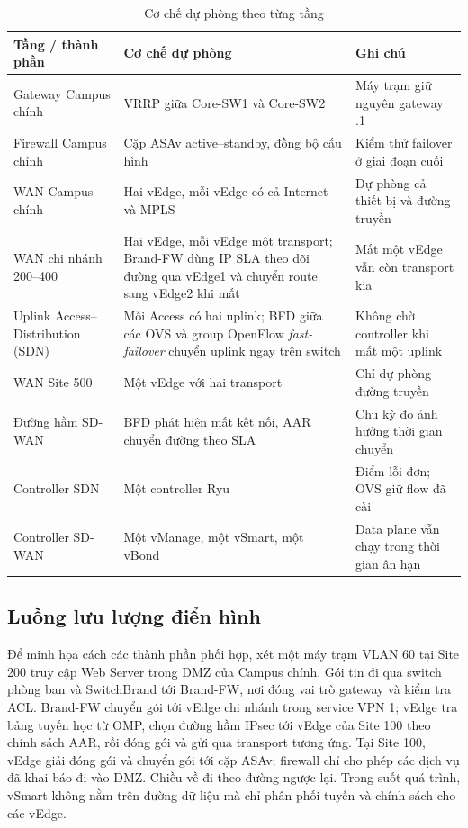 \begin{table}[H]
    \centering
    \small
    \caption{Cơ chế dự phòng theo từng tầng}
    \label{tab:du_phong}
    \begin{tabularx}{\textwidth}{|P{3.0cm}|X|P{3.6cm}|}
        \hline
        \textbf{Tầng / thành phần} & \textbf{Cơ chế dự phòng} & \textbf{Ghi chú} \\
        \hline
        Gateway Campus chính & VRRP giữa Core-SW1 và Core-SW2 & Máy trạm giữ nguyên gateway .1 \\
        \hline
        Firewall Campus chính & Cặp ASAv active--standby, đồng bộ cấu hình & Kiểm thử failover ở giai đoạn cuối \\
        \hline
        WAN Campus chính & Hai vEdge, mỗi vEdge có cả Internet và MPLS & Dự phòng cả thiết bị và đường truyền \\
        \hline
        WAN chi nhánh 200--400 & Hai vEdge, mỗi vEdge một transport; Brand-FW dùng IP SLA theo dõi đường qua vEdge1 và chuyển route sang vEdge2 khi mất & Mất một vEdge vẫn còn transport kia \\
        \hline
        Uplink Access--Distribution (SDN) & Mỗi Access có hai uplink; BFD giữa các OVS và group OpenFlow \textit{fast-failover} chuyển uplink ngay trên switch & Không chờ controller khi mất một uplink \\
        \hline
        WAN Site 500 & Một vEdge với hai transport & Chỉ dự phòng đường truyền \\
        \hline
        Đường hầm SD-WAN & BFD phát hiện mất kết nối, AAR chuyển đường theo SLA & Chu kỳ đo ảnh hưởng thời gian chuyển \\
        \hline
        Controller SDN & Một controller Ryu & Điểm lỗi đơn; OVS giữ flow đã cài \\
        \hline
        Controller SD-WAN & Một vManage, một vSmart, một vBond & Data plane vẫn chạy trong thời gian ân hạn \\
        \hline
    \end{tabularx}
\end{table}

\subsection{Luồng lưu lượng điển hình}

Để minh họa cách các thành phần phối hợp, xét một máy trạm VLAN 60 tại Site 200 truy cập Web Server trong DMZ của Campus chính. Gói tin đi qua switch phòng ban và SwitchBrand tới Brand-FW, nơi đóng vai trò gateway và kiểm tra ACL. Brand-FW chuyển gói tới vEdge chi nhánh trong service VPN 1; vEdge tra bảng tuyến học từ OMP, chọn đường hầm IPsec tới vEdge của Site 100 theo chính sách AAR, rồi đóng gói và gửi qua transport tương ứng. Tại Site 100, vEdge giải đóng gói và chuyển gói tới cặp ASAv; firewall chỉ cho phép các dịch vụ đã khai báo đi vào DMZ. Chiều về đi theo đường ngược lại. Trong suốt quá trình, vSmart không nằm trên đường dữ liệu mà chỉ phân phối tuyến và chính sách cho các vEdge.
